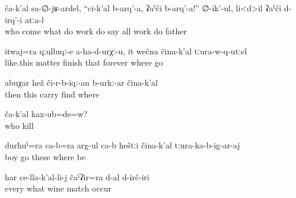 \begin{exe}
	\ex	\label{ex:Whoever came saying, do something, do this work, father did all works}
	\gll	ča-k'al	sa-∅-jʁ-ardel,		``ci-k'al	b-arq'-a,	ʡaˁči	b-arq'-a!''	∅-ik'-ul,	li<d>il	ʡaˁči	d-irq'-i	atːa-l\\
		who	come		what	do		work	do	say	all	work	do	father\\
	\glt	{}

	\ex	\label{ex:And like this also (Isakadi’s) issues, things do not finish, forever, wherever he went}
	\gll	itwaj=ra	qːulluqː-e	a-ha-d-urχː-u,	it	wečna	čina-k'al	tːura-w-q-utːel\\
		like.this	matter	finish	that	forever	where	go\\
	\glt	{}

	\ex	\label{ex:Then this needs to be positioned somewhere (else) probably}
	\gll	abuχar	hež	či-r-b-iqː-an	b-urkː-ar	čina-k'al\\
		then	this	carry	find	where\\
	\glt	{}

	\ex	\label{ex:Did you kill anyone}
	\gll	ča-k'al	kax-ub=de=w?\\
		who	kill\\
	\glt	{}

	\ex	\label{ex:And together with the son they are going to sit outside anywhere}
	\gll	durħuˁ=ra	ca-b=ra	arg-ul ca-b	heštːi	čina-k'al	tːura-ka-b-ig-ar-aj\\
		boy		go 	these	where	be\\
	\glt	{}

	\ex	\label{ex:Wine fit well with any of these (types of food)}
	\gll	har	ce-lla-k'al-li-j	čaˁʡir=ra	d-al d-irč-iri\\
		every	what	wine	\tsc{npl-}match occur\\
	\glt	{}
\end{exe}

